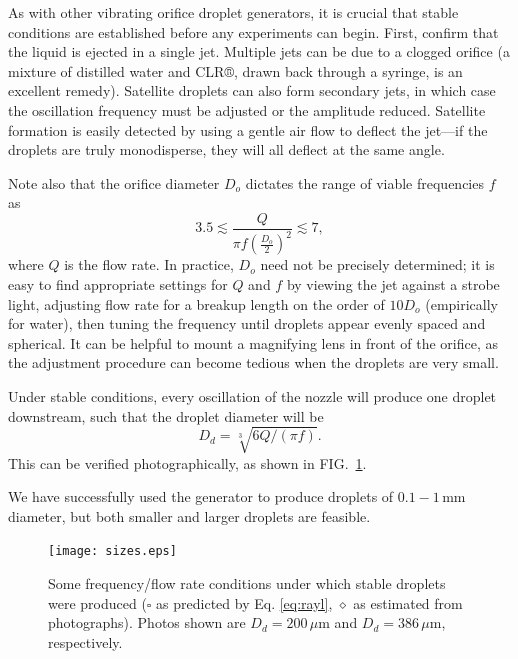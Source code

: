 \documentclass[11.5pt,oneside]{book}
\begin{document}
As with other vibrating orifice droplet generators, it is crucial that stable
conditions are established before any experiments can begin. First, confirm that
the liquid is ejected in a single jet. Multiple jets can be due to a clogged
orifice (a mixture of distilled water and CLR®, drawn back through a
syringe, is an excellent remedy). Satellite droplets can also form secondary
jets, in which case the oscillation frequency must be adjusted or the amplitude
reduced. Satellite formation is easily detected by using a gentle air flow to
deflect the jet---if the droplets are truly monodisperse, they will all deflect
at the same angle.\cite{Strom69}

Note also that the orifice diameter $D_o$ dictates the range of viable
frequencies $f$ as 
\begin{equation}
    3.5 \lesssim \frac{Q}{\pi f \left(\frac{D_o}{2}\right)^2}
\lesssim 7,
\end{equation}
where $Q$ is the flow rate.\cite{Savart33, Rayleigh79} In
practice, $D_o$ need not be
precisely determined; it is easy to find appropriate settings for $Q$
and $f$ by viewing the jet against a strobe light, adjusting flow rate for a breakup
length on the order of $10 D_o$ (empirically for water), then tuning the frequency
until droplets appear evenly spaced and spherical. It can be helpful to mount a
magnifying lens in front of the orifice, as the adjustment procedure can become
tedious when the droplets are very small.

Under stable conditions, every oscillation of the nozzle will produce one droplet
downstream,\cite{Rayleigh79} such that the droplet diameter will be 
\begin{equation}
        D_d = \sqrt[3]{6Q/(\pi f)}.\label{eq:rayl}
\end{equation}
This can be verified photographically, as shown in FIG.~\ref{fig:dropphoto}.

We have successfully used the generator to produce droplets of
$0.1-1\,$mm diameter, but both smaller and larger droplets are feasible.

\begin{figure}[h!]
\centering
\texttt{[image: sizes.eps]}
\caption{Some frequency/flow rate conditions under which stable droplets were
        produced ($\square$ as predicted by Eq. \ref{eq:rayl},
        {\Large$\diamond$} as estimated
        from photographs). Photos shown are $D_d = 200\,\mu$m and $D_d = 386\,\mu$m,
        respectively.
       \label{fig:dropphoto}}
\end{figure}
\end{document}
